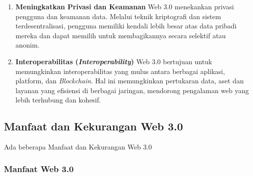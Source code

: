 \documentclass[a4paper]{article}
\begin{document}
\begin{enumerate}
      \item {
            \raggedleft\textbf{Meningkatkan Privasi dan Keamanan }
            \linebreak
            \justifying
            Web 3.0 menekankan privasi pengguna dan keamanan data. Melalui
            teknik kriptografi dan sistem terdesentralisasi, pengguna memiliki
            kendali lebih besar atas data pribadi mereka dan dapat memilih untuk
            membagikannya secara selektif atau anonim.
            }

      \item {
            \raggedleft\textbf{Interoperabilitas (\textit{Interoperability})}
            \linebreak
            \justifying
            Web 3.0 bertujuan untuk memungkinkan interoperabilitas yang mulus
            antara berbagai aplikasi, platform, dan \textit{Blockchain}. Hal ini
            memungkinkan pertukaran data, aset dan layanan yang efisiensi di
            berbagai jaringan, mendorong pengalaman web yang lebih terhubung dan
            kohesif.
            }
\end{enumerate}

\subsection{Manfaat dan Kekurangan Web 3.0}

Ada beberapa Manfaat dan Kekurangan Web 3.0

\subsubsection{Manfaat Web 3.0}
\end{document}
